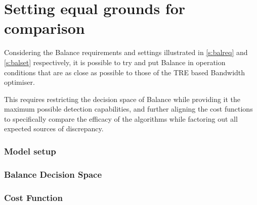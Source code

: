 \section{Setting equal grounds for comparison}

Considering the Balance requirements and settings illustrated in \ref{s:balreq} and \ref{s:balset} respectively, it is possible to try and put Balance in operation conditions that are as close as possible to those of the TRE based Bandwidth optimiser.

This requires restricting the decision space of Balance while providing it the maximum possible detection capabilities, and further aligning the cost functions to specifically compare the efficacy of the algorithms while factoring out all expected sources of discrepancy.

\subsubsection{Model setup}

\subsubsection{Balance Decision Space}


\subsubsection{Cost Function}

